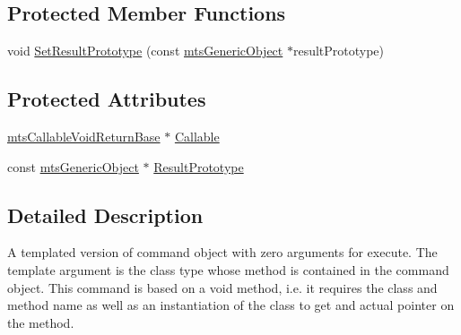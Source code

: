 \subsection*{Protected Member Functions}
\begin{DoxyCompactItemize}
\item 
void \hyperlink{classmts_command_void_return_a1393eee6b6e79629738af15bc486b68f}{Set\-Result\-Prototype} (const \hyperlink{classmts_generic_object}{mts\-Generic\-Object} $\ast$result\-Prototype)
\end{DoxyCompactItemize}
\subsection*{Protected Attributes}
\begin{DoxyCompactItemize}
\item 
\hyperlink{classmts_callable_void_return_base}{mts\-Callable\-Void\-Return\-Base} $\ast$ \hyperlink{classmts_command_void_return_a724dc0b6b5cc0a0fcc783aaa39e0ec8e}{Callable}
\item 
const \hyperlink{classmts_generic_object}{mts\-Generic\-Object} $\ast$ \hyperlink{classmts_command_void_return_aaf7b0c693d09cd4664f114b97200911d}{Result\-Prototype}
\end{DoxyCompactItemize}


\subsection{Detailed Description}
A templated version of command object with zero arguments for execute. The template argument is the class type whose method is contained in the command object. This command is based on a void method, i.\-e. it requires the class and method name as well as an instantiation of the class to get and actual pointer on the method. 

